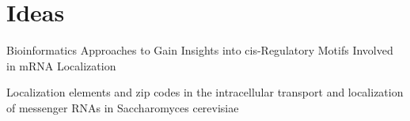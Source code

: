 \documentclass[../main.tex]{subfiles}
\begin{document}
\section{Ideas}

Bioinformatics Approaches to Gain Insights into cis-Regulatory Motifs Involved in mRNA Localization %

Localization elements and zip codes in the intracellular transport and localization of messenger RNAs in Saccharomyces cerevisiae

\end{document}
